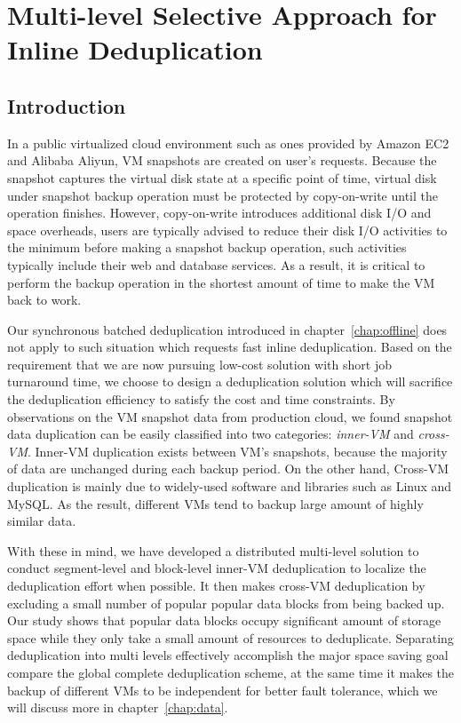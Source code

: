 \chapter{Multi-level Selective Approach for Inline Deduplication}
\label{chap:inline}

\section{Introduction}
\label{inline:intro}
In a public virtualized cloud environment such as ones provided by Amazon EC2\cite{AmazonEC2} and Alibaba Aliyun\cite{Aliyun},
VM snapshots are created on user's requests. Because the snapshot captures 
the virtual disk state at a specific point of time,
virtual disk under snapshot backup operation must be protected by copy-on-write until the 
operation finishes. However, copy-on-write introduces additional disk I/O and space overheads, 
users are typically advised to reduce their disk I/O activities to the minimum before making
a snapshot backup operation, such activities typically include their web and database services. 
As a result,
it is critical to perform the backup operation in the shortest amount of time 
to make the VM back to work.

Our synchronous batched deduplication introduced in chapter~\ref{chap:offline} does not apply 
to such situation which requests fast inline deduplication.
Based on the requirement that we are now pursuing low-cost solution with short job turnaround time,
we choose to design a deduplication solution which will sacrifice the deduplication efficiency to 
satisfy the cost and time constraints.
By observations on the VM snapshot data from production cloud, we found snapshot data duplication 
can be easily classified into two categories: \emph{inner-VM} and \emph{cross-VM}. Inner-VM duplication
exists between VM's snapshots, because the majority of data are unchanged during each backup period. 
On the other hand, Cross-VM duplication is mainly due to widely-used software and libraries such as Linux and MySQL.
As the result, different VMs tend to backup large amount of highly similar data.

With these in mind, we have developed a distributed multi-level solution to conduct 
segment-level  and block-level inner-VM  deduplication to localize the deduplication effort when possible.
It then makes cross-VM deduplication by excluding a small number of
popular popular data blocks from being backed up. Our study shows that popular data blocks
occupy significant amount of storage space while they only take
a small amount of resources to deduplicate.
Separating deduplication into multi levels effectively accomplish the major space saving goal
compare the global complete deduplication scheme, at the same time it makes
the backup of different VMs to be independent for better fault tolerance, 
which we will discuss more in chapter~\ref{chap:data}.

